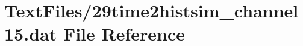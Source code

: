 \hypertarget{29time2histsim__channel15_8dat}{}\section{Text\+Files/29time2histsim\+\_\+channel15.dat File Reference}
\label{29time2histsim__channel15_8dat}
